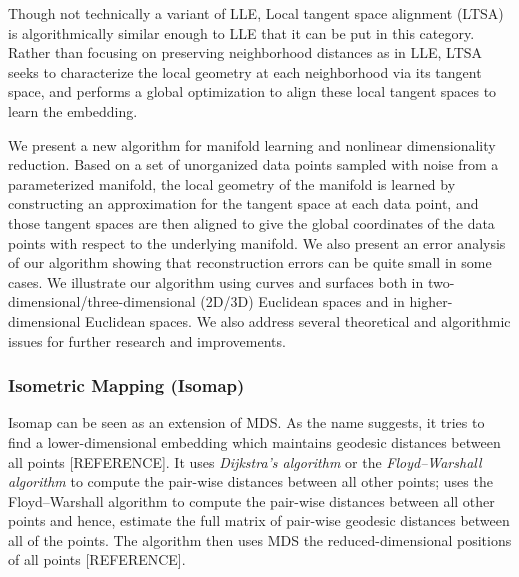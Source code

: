 \documentclass[journal, a4paper]{IEEEtran}
\begin{document}
Though not technically a variant of LLE, Local tangent space alignment (LTSA) is algorithmically similar enough to LLE that it can be put in this category. Rather than focusing on preserving neighborhood distances as in LLE, LTSA seeks to characterize the local geometry at each neighborhood via its tangent space, and performs a global optimization to align these local tangent spaces to learn the embedding. 

%

We present a new algorithm for manifold learning and nonlinear dimensionality reduction. Based on a set of unorganized data points sampled with noise from a parameterized manifold, the local geometry of the manifold is learned by constructing an approximation for the tangent space at each data point, and those tangent spaces are then aligned to give the global coordinates of the data points with respect to the underlying manifold. We also present an error analysis of our algorithm showing that reconstruction errors can be quite small in some cases. We illustrate our algorithm using curves and surfaces both in two-dimensional/three-dimensional (2D/3D) Euclidean spaces and in higher-dimensional Euclidean spaces. We also address several theoretical and algorithmic issues for further research and improvements.



\subsubsection{Isometric Mapping (Isomap)}

Isomap can be seen as an extension of MDS. %
As the name suggests, it tries to find a lower-dimensional embedding which maintains geodesic distances between all points [REFERENCE].  
It uses \textit{Dijkstra's algorithm} or  the \textit{Floyd–Warshall algorithm} to compute the pair-wise distances between all other points;  uses the Floyd–Warshall algorithm to compute the pair-wise distances between all other points and hence, estimate the full matrix of pair-wise geodesic distances between all of the points. The algorithm then uses MDS the reduced-dimensional positions of all points [REFERENCE].
\end{document}
